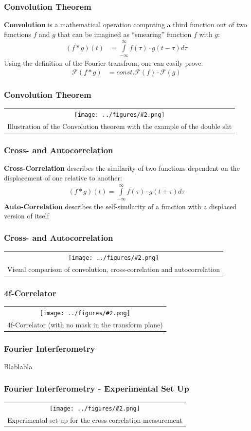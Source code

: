 \documentclass{beamer}
\newcommand{\gra}[3][]{
	\begin{table}
	\centering
	\begin{tabular}[width=\textwidth]{c}
		\texttt{[image: ../figures/\#2.png]}\\
		\small #3
	\end{tabular}
	\end{table}
}
\begin{document}
\begin{frame}
	\frametitle{Convolution Theorem}
	\textbf{Convolution} is a mathematical operation computing a third function out of two functions $f$ and $g$ that can be imagined as ``smearing'' function $f$ with $g$:
	\begin{align}
	(f*g)(t)&=\int\limits_{-\infty}^{\infty} f(\tau)\cdot g(t-\tau) d\tau
	\end{align}
	Using the definition of the Fourier transfrom, one can easily prove:
	\begin{align}
	\mathscr{F}(f*g)&=const. \mathscr{F}(f)\cdot \mathscr{F}(g)
	\end{align}
\end{frame}
\begin{frame}
	\frametitle{Convolution Theorem}
	\gra[0.7]{Convolution}{Illustration of the Convolution theorem with the example of the double slit}
\end{frame}
\begin{frame}
	\frametitle{Cross- and Autocorrelation}
\textbf{Cross-Correlation} describes the similarity of two functions dependent on the displacement of one relative to another:
	\begin{align}
	(f*g)(t)=\int\limits_{-\infty}^{\infty} f(\tau)\cdot g(t+\tau) d\tau \label{corr}
	\end{align}
\textbf{Auto-Correlation} describes the self-similarity of a function with a displaced version of itself
\end{frame}
\begin{frame}
	\frametitle{Cross- and Autocorrelation}
	\gra[0.7]{correlation}{Visual comparison of convolution, cross-correlation and autocorrelation  \footnotemark} 
\end{frame}
\begin{frame}
	\frametitle{4f-Correlator}
	\gra[0.8]{Correlator}{4f-Correlator (with no mask in the transform plane)\footfullcite{http://www4.uwsp.edu/physastr/kmenning/images/Hecht4.11.F.26.png}} 
\end{frame}
\begin{frame}
	\frametitle{Fourier Interferometry}
	Blablabla
\end{frame}
\begin{frame}
	\frametitle{Fourier Interferometry - Experimental Set Up}
   \gra[0.8]{Versuchsaufbau_4}{Experimental set-up for the cross-correlation measurement  \footfullcite{Bamberger}}
\end{frame}
\end{document}
